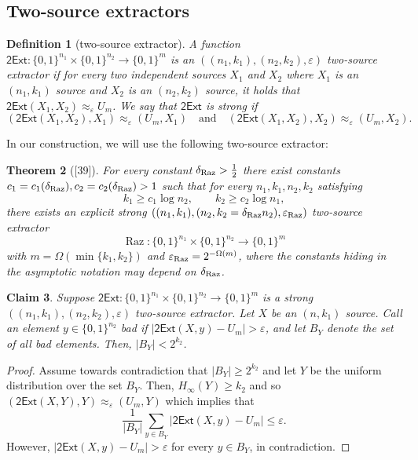\documentclass[10pt,a4paper]{article}
\newtheorem{theorem}{Theorem}
\newtheorem{definition}[theorem]{Definition}
\newtheorem{claim}[theorem]{Claim}
\DeclareMathOperator{\Raz}{Raz}
\newcommand{\twoExt}{\mathsf{2Ext}}
\begin{document}
\subsection*{Two-source extractors}
\begin{definition}[two-source extractor]
A function $\twoExt:\{0,1\}^{n_1}\times\{0,1\}^{n_2}\to\{0,1\}^m$ is an $((n_1,k_1),(n_2,k_2),\varepsilon)$ two-source extractor if for every two independent sources $X_1$ and $X_2$ where $X_1$ is an $(n_1,k_1)$ source and $X_2$ is an $(n_2,k_2)$ source, it holds that $\twoExt(X_1,X_2)\approx_\varepsilon U_m$. We say that $\twoExt$ is strong if
\[(\twoExt(X_1,X_2),X_1)\approx_\varepsilon(U_m,X_1)\quad\text{and}\quad(\twoExt(X_1,X_2),X_2)\approx_\varepsilon(U_m,X_2).\]
\end{definition}
In our construction, we will use the following two-source extractor:
\begin{theorem}[{[39]}]
For every constant $\delta_{\rm Raz}>\frac12$ there exist constants $c_1=c_1(\delta_{\rm Raz}),c_2=c_2(\delta_{\rm Raz})>1$ such that for every $n_1,k_1,n_2,k_2$ satisfying
\[k_1\ge c_1\log n_2,\qquad k_2\ge c_2\log n_1,\]
there exists an explicit strong $((n_1,k_1),(n_2,k_2=\delta_{\rm Raz}n_2),\varepsilon_{\rm Raz})$ two-source extractor
\[\Raz:\{0,1\}^{n_1}\times\{0,1\}^{n_2}\to\{0,1\}^m\]
with $m=\Omega(\min\{k_1,k_2\})$ and $\varepsilon_{\rm Raz}=2^{-\Omega(m)}$, where the constants hiding in the asymptotic notation may depend on $\delta_{\rm Raz}$.
\end{theorem}
\begin{claim}
Suppose $\twoExt:\{0,1\}^{n_1}\times\{0,1\}^{n_2}\to\{0,1\}^m$ is a strong $((n_1,k_1),(n_2,k_2),\varepsilon)$ two-source extractor. Let $X$ be an $(n,k_1)$ source. Call an element $y\in\{0,1\}^{n_2}$ bad if $|\twoExt(X,y)-U_m|>\varepsilon$, and let $B_Y$ denote the set of all bad elements. Then, $|B_Y|<2^{k_2}$.
\end{claim}
\begin{proof}
Assume towards contradiction that $|B_Y|\ge2^{k_2}$ and let $Y$ be the uniform distribution over the set $B_Y$. Then, $H_\infty(Y)\ge k_2$ and so $(\twoExt(X,Y),Y)\approx_\varepsilon(U_m,Y)$ which implies that
\[\frac1{|B_Y|}\sum_{y\in B_Y}|\twoExt(X,y)-U_m|\le\varepsilon.\]
However, $|\twoExt(X,y)-U_m|>\varepsilon$ for every $y\in B_Y$, in contradiction.
\end{proof}
\end{document}
